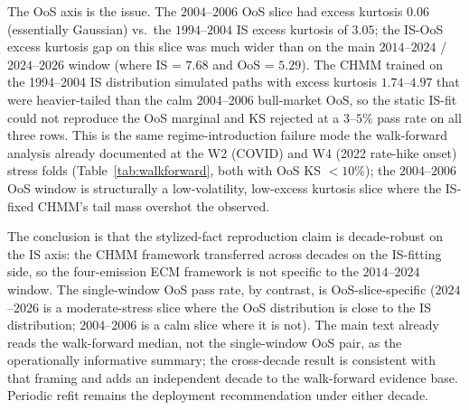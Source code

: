 The OoS axis is the issue. The $2004$--$2006$ OoS slice had excess kurtosis $0.06$ (essentially Gaussian) vs.\ the $1994$--$2004$ IS excess kurtosis of $3.05$; the IS-OoS excess kurtosis gap on this slice was much wider than on the main $2014$--$2024$ / $2024$--$2026$ window (where IS = $7.68$ and OoS = $5.29$). The CHMM trained on the 1994--2004 IS distribution simulated paths with excess kurtosis $1.74$--$4.97$ that were heavier-tailed than the calm 2004--2006 bull-market OoS, so the static IS-fit could not reproduce the OoS marginal and KS rejected at a $3$--$5\%$ pass rate on all three rows. This is the same regime-introduction failure mode the walk-forward analysis already documented at the W2 (COVID) and W4 (2022 rate-hike onset) stress folds (Table~\ref{tab:walkforward}, both with OoS KS $< 10\%$); the $2004$--$2006$ OoS window is structurally a low-volatility, low-excess kurtosis slice where the IS-fixed CHMM's tail mass overshot the observed.

The conclusion is that the stylized-fact reproduction claim is decade-robust on the IS axis: the CHMM framework transferred across decades on the IS-fitting side, so the four-emission ECM framework is not specific to the $2014$--$2024$ window. The single-window OoS pass rate, by contrast, is OoS-slice-specific ($2024$--$2026$ is a moderate-stress slice where the OoS distribution is close to the IS distribution; $2004$--$2006$ is a calm slice where it is not). The main text already reads the walk-forward median, not the single-window OoS pair, as the operationally informative summary; the cross-decade result is consistent with that framing and adds an independent decade to the walk-forward evidence base. Periodic refit remains the deployment recommendation under either decade.
